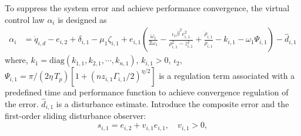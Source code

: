 \documentclass[pdflatex,sn-mathphys-num]{sn-jnl}%
\theoremstyle{thmstyleone}%
\theoremstyle{thmstyletwo}%
\theoremstyle{thmstylethree}%
\begin{document}
To suppress the system error and achieve performance convergence, the virtual control law $\alpha_i$ is designed as 
\begin{equation}	\label{eq:30}
	\begin{aligned}
	\alpha_i
	&= \dot q_{i,d}-e_{i,2}+\delta_{i,1}-\mu_1 \zeta_{i,1}+e_{i,1}\left( \frac{\dot{\omega}_{1}}{2 \omega_{1}}-\frac{\iota_1  \dot{\beta}^{2} e_{i,1}^{2} }{\rho_{i,1}^{2} - z_{i,1}^{2}} 
	+\frac{\dot\rho_{i,1}}{\rho_{i,1}} - k_{i,1} 
	- \omega_{1} \Psi_{i,1}   \right)-{\hat d}_{i,1}
\end{aligned}
\end{equation}
where, $k_{1}=\text{diag}(k_{1,1}, k_{2,1},\cdots, k_{n,1})$, $k_{i,1}>0 $, $\iota_2$, $\Psi_{i,1}={\pi}/({2 \eta\,T_p})[1+(n z_{i,1}\varGamma_{i,1}/2)^{{\eta}/{2}}]$ is a regulation term associated with a predefined time and performance function to achieve convergence regulation of the error. \(\hat d_{i,1}\) is a disturbance estimate.
Introduce the composite error and the first-order sliding disturbance observer:
\begin{equation}\label{eq:31}
	 s_{i,1} = e_{i,2} + v_{i,1} e_{i,1}, \quad v_{i,1}>0,
\end{equation}
\end{document}
